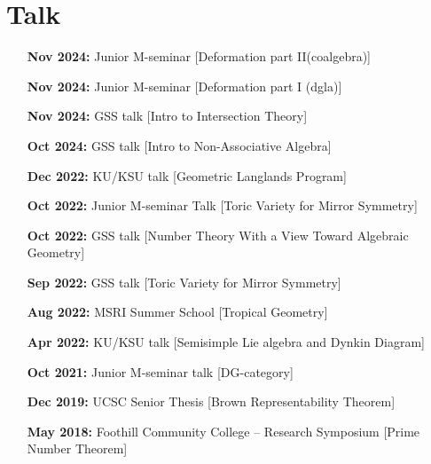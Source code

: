 \documentclass{article}
\begin{document}
\section*{Talk}
\begin{itemize}[
    labelwidth=3cm,
    labelsep=5mm,
    leftmargin=!,
    align=left ]
\item[\bfseries{Nov 2024:}] Junior M-seminar [Deformation part II(coalgebra)] 
\item[\bfseries{Nov 2024:}] Junior M-seminar [Deformation part I (dgla)] 
\item[\bfseries{Nov 2024:}] GSS talk [Intro to Intersection Theory] 
\item[\bfseries{Oct 2024:}] GSS talk [Intro to Non-Associative Algebra] 
\item[\bfseries{Dec 2022:}] KU/KSU talk [Geometric Langlands Program] 
\item[\bfseries{Oct 2022:}] Junior M-seminar Talk [Toric Variety for Mirror Symmetry] 
\item[\bfseries{Oct 2022:}] GSS talk [Number Theory With a View Toward Algebraic Geometry]
\item[\bfseries{Sep 2022:}] GSS talk [Toric Variety for Mirror Symmetry] 
\item[\bfseries{Aug 2022:}] MSRI Summer School [Tropical Geometry] 
\item[\bfseries{Apr 2022:}] KU/KSU talk [Semisimple Lie algebra and Dynkin Diagram] 
\item[\bfseries{Oct 2021:}] Junior M-seminar talk [DG-category] 
\item[\bfseries{Dec 2019:}] UCSC Senior Thesis [Brown Representability Theorem] 
\item[\bfseries{May 2018:}] Foothill Community College -- Research Symposium [Prime Number Theorem]
\end{itemize}
\end{document}
